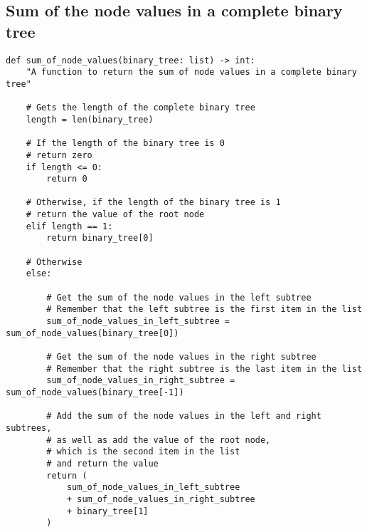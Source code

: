 \documentclass[11pt]{article}
\begin{document}
\subsection{Sum of the node values in a complete binary tree}
\label{sec:org4a16e2d}
\begin{verbatim}
def sum_of_node_values(binary_tree: list) -> int:
    "A function to return the sum of node values in a complete binary tree"

    # Gets the length of the complete binary tree
    length = len(binary_tree)

    # If the length of the binary tree is 0
    # return zero
    if length <= 0:
        return 0

    # Otherwise, if the length of the binary tree is 1
    # return the value of the root node
    elif length == 1:
        return binary_tree[0]

    # Otherwise
    else:

        # Get the sum of the node values in the left subtree
        # Remember that the left subtree is the first item in the list
        sum_of_node_values_in_left_subtree = sum_of_node_values(binary_tree[0])

        # Get the sum of the node values in the right subtree
        # Remember that the right subtree is the last item in the list
        sum_of_node_values_in_right_subtree = sum_of_node_values(binary_tree[-1])

        # Add the sum of the node values in the left and right subtrees,
        # as well as add the value of the root node,
        # which is the second item in the list
        # and return the value
        return (
            sum_of_node_values_in_left_subtree
            + sum_of_node_values_in_right_subtree
            + binary_tree[1]
        )
\end{verbatim}

 \newpage
\end{document}
